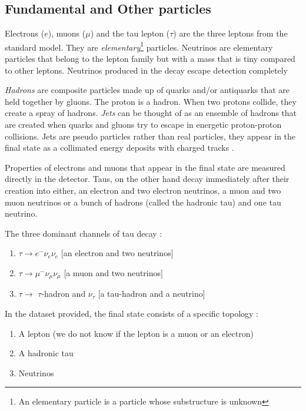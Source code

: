 \documentclass[final,3p,times,twocolumn]{elsarticle}
\begin{document}
\subsection{Fundamental and Other particles}

Electrons ($e$), muons ($\mu$) and the tau lepton ($\tau$) are the three leptons from the standard model. They are \textit{elementary}\footnote{An elementary particle is a particle whose substructure is unknown} particles. Neutrinos are elementary particles that belong to the lepton family but with a mass that is tiny compared to other leptons. Neutrinos produced in the decay escape detection completely 

\textit{Hadrons} are composite particles made up of quarks and/or antiquarks that are held together by gluons. The proton is a hadron. When two protons collide, they create a spray of hadrons. \textit{Jets} can be thought of as an ensemble of hadrons that are created when quarks and gluons try to escape in energetic proton-proton collisions. Jets are pseudo particles rather than real particles, they appear in the final state as a collimated energy deposits with charged tracks \cite{CMS:2} \cite{RM}. 

Properties of electrons and muons that appear in the final state are measured directly in the detector. Taus, on the other hand decay immediately after their creation into either, an electron and two electron neutrinos, a muon and two muon neutrinos or a bunch of hadrons (called the hadronic tau) and one tau neutrino. 

The three dominant channels of tau decay :

\begin{enumerate}[noitemsep]
\item{$\tau \rightarrow e^{-}\nu_{e}\nu_{e}$} [an electron and two neutrinos]
\item{$\tau \rightarrow \mu^{-}\nu_{\mu}\nu_{\mu}$} [a muon and two neutrinos]
\item{$\tau \rightarrow$  $\tau$-hadron and $\nu_{\tau}$ [a tau-hadron and a neutrino]}
\end{enumerate} 

In the dataset provided, the final state consists of a specific topology :

\begin{enumerate}[noitemsep]
\item A lepton (we do not know if the lepton is a muon or an electron)
\item A hadronic tau 
\item Neutrinos 
\end{enumerate}
\end{document}
